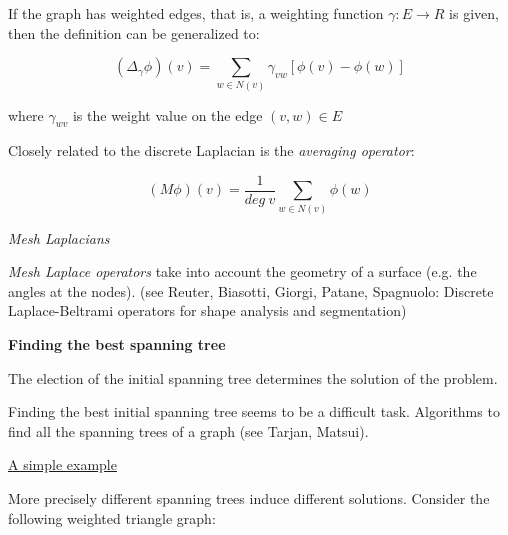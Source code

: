 \documentclass[a4paper,11pt]{article}
\begin{document}
\bigskip

If the graph has weighted edges, that is, a weighting function $\gamma: 
E \rightarrow R$ is given, then the definition can be generalized to:

$$(\Delta_{\gamma} \phi)(v) = \sum_{w \in N(v)} \gamma_{vw} [\phi(v) - \phi(w)]$$

where $\gamma_{wv}$ is the weight value on the edge $(v,w) \in E$

\bigskip

Closely related to the discrete Laplacian is the \textit{averaging 
operator}:

$$(M \phi)(v) = \frac{1}{deg \ v} \sum_{w \in N(v)} \phi(w)$$

\textit{Mesh Laplacians}

\bigskip

\textit{Mesh Laplace operators} take into account the geometry of  a 
surface (e.g. the angles at the nodes). (see Reuter, Biasotti, Giorgi, 
Patane, Spagnuolo: Discrete Laplace-Beltrami operators for shape 
analysis and segmentation)

\newpage

\textbf{Finding the best spanning tree}

\bigskip

The election of the initial spanning tree determines the solution of 
the problem.

\smallskip

Finding the best initial spanning tree seems to be a difficult task. 
Algorithms to find all the spanning trees of a graph (see Tarjan, Matsui).

\bigskip

\underline{A simple example}

\bigskip

More precisely different spanning trees induce different solutions. 
Consider the following weighted triangle graph:

\bigskip

\end{document}
